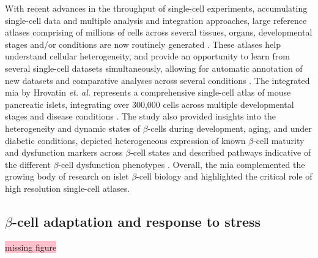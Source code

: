 With recent advances in the throughput of single-cell experiments, accumulating single-cell data and multiple analysis and integration approaches, large reference atlases comprising of millions of cells across several tissues, organs, developmental stages and/or conditions are now routinely generated \textbf{\cite{regev_human_nodate}}. These atlases help understand cellular heterogeneity, and provide an opportunity to learn from several single-cell datasets simultaneously, allowing for automatic annotation of new datasets and comparative analyses across several conditions \textbf{\cite{rood_impact_2022,lotfollahi_mapping_2021}}. The integrated \gls{mia} by Hrovatin \textit{et. al.} represents a comprehensive single-cell atlas of mouse pancreatic islets, integrating over 300,000 cells across multiple developmental stages and disease conditions \textbf{\cite{hrovatin_delineating_2023}}. The study also provided insights into the heterogeneity and dynamic states of $\beta$-cells during development, aging, and under diabetic conditions, depicted heterogeneous expression of known $\beta$-cell maturity and dysfunction markers across $\beta$-cell states and described pathways indicative of the different $\beta$-cell dysfunction phenotypes \textbf{\cite{hrovatin_delineating_2023}}. Overall, the \gls{mia} complemented the growing body of research on islet $\beta$-cell biology and highlighted the critical role of high resolution single-cell atlases.


\subsection{$\beta$-cell adaptation and response to stress}
\colorbox{pink}{missing figure} \\

